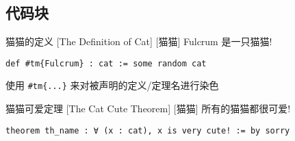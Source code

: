 \documentclass[UTF8]{ctexart}
\begin{document}
        \subsection{代码块}

        
        \begin{dfn}
            [Cat]
            {猫猫的定义}
            [The Definition of Cat]
            [猫猫]
            Fulcrum 是一只猫猫! 
            \begin{lstlisting}[style=lean]
    def #tm{Fulcrum} : cat := some random cat
            \end{lstlisting}

            使用 \texttt{\#tm\{...\}} 来对被声明的定义/定理名进行染色
        \end{dfn}
        
        \begin{thm}
            [CatCuteTheorem]
            {猫猫可爱定理}
            [The Cat Cute Theorem]
            [猫猫]
            所有的猫猫都很可爱! 
            \begin{lstlisting}[style=lean]
    theorem th_name : ∀ (x : cat), x is very cute! := by sorry
            \end{lstlisting}
        \end{thm}
\end{document}
